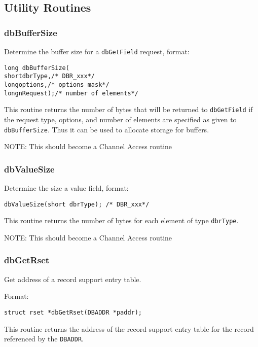 \subsection{Utility Routines}

\subsubsection{dbBufferSize}

Determine the buffer size for a \verb|dbGetField| request, format:

\begin{verbatim}long dbBufferSize(
shortdbrType,/* DBR_xxx*/
longoptions,/* options mask*/
longnRequest);/* number of elements*/
\end{verbatim}This routine returns the number of bytes that will be returned to \verb|dbGetField| if the request type, options, and number of 
elements are specified as given to \verb|dbBufferSize|. Thus it can be used to allocate storage for buffers.

NOTE: This should become a Channel Access routine

\subsubsection{dbValueSize}

Determine the size a value field, format:

\begin{verbatim}dbValueSize(short dbrType); /* DBR_xxx*/
\end{verbatim}This routine returns the number of bytes for each element of type \verb|dbrType|.

NOTE: This should become a Channel Access routine

\subsubsection{dbGetRset}

Get address of a record support entry table.

Format:

\begin{verbatim}struct rset *dbGetRset(DBADDR *paddr);
\end{verbatim}This routine returns the address of the record support entry table for the record referenced by the \verb|DBADDR|.

